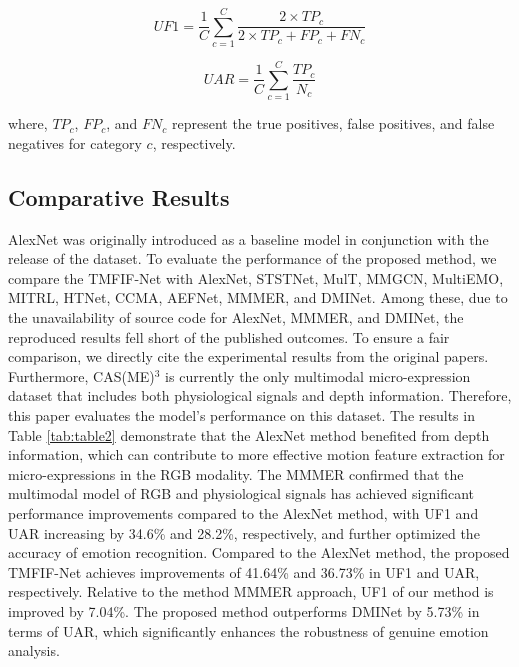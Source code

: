 \documentclass[lettersize,journal]{IEEEtran}
\begin{document}
\begin{equation}
\label{eq_17}
UF1 = \frac{1}{C} \sum_{c=1}^{C}
\frac{2 \times TP_c}{2 \times TP_c + FP_c + FN_c}
\end{equation}

\begin{equation}
\label{eq_18}
UAR = \frac{1}{C} \sum_{c=1}^{C} \frac{TP_c}{N_c}
\end{equation}

\noindent where, $TP_c$, $FP_c$, and $FN_c$ represent the true positives, false positives, and false negatives for category $c$, respectively.

\subsection{Comparative Results}

AlexNet\cite{24} was originally introduced as a baseline model in conjunction with the release of the dataset. To evaluate the performance of the proposed method, we compare the TMFIF-Net with AlexNet\cite{24}, STSTNet\cite{18}, MulT\cite{40}, MMGCN\cite{41}, MultiEMO\cite{42}, MITRL\cite{43}, HTNet\cite{23}, CCMA\cite{44}, AEFNet\cite{45}, MMMER\cite{7}, and DMINet\cite{46}. Among these, due to the unavailability of source code for AlexNet, MMMER, and DMINet, the reproduced results fell short of the published outcomes. To ensure a fair comparison, we directly cite the experimental results from the original papers. Furthermore, CAS(ME)$^{3}$ is currently the only multimodal micro-expression dataset that includes both physiological signals and depth information. Therefore, this paper evaluates the model’s performance on this dataset. The results in Table \ref{tab:table2} demonstrate that the AlexNet method benefited from depth information, which can contribute to more effective motion feature extraction for micro-expressions in the RGB modality. The MMMER confirmed that the multimodal model of RGB and physiological signals has achieved significant performance improvements compared to the AlexNet method, with UF1 and UAR increasing by 34.6\% and 28.2\%, respectively, and further optimized the accuracy of emotion recognition. Compared to the AlexNet method, the proposed TMFIF-Net achieves improvements of 41.64\% and 36.73\% in UF1 and UAR, respectively. Relative to the method MMMER approach, UF1 of our method is improved by 7.04\%. The proposed method outperforms DMINet by 5.73\% in terms of UAR, which significantly enhances the robustness of genuine emotion analysis.
\end{document}
